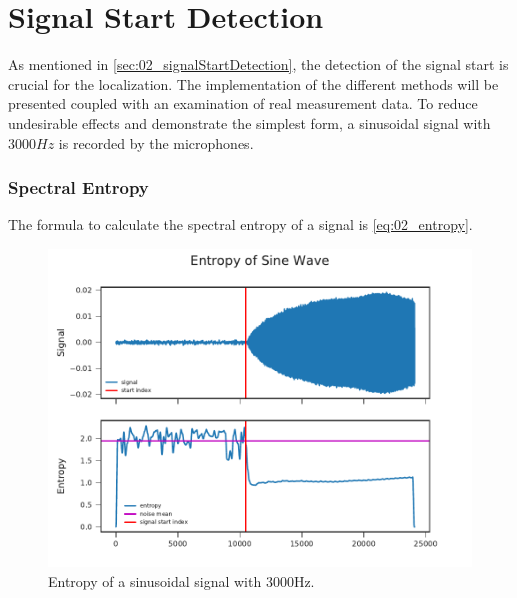 \section{Signal Start Detection}
\label{sec:03_signalStartDetection}

As mentioned in \ref{sec:02_signalStartDetection}, the detection of the
signal start is crucial for the localization.
The implementation of the different methods will be presented coupled with
an examination of real measurement data.
To reduce undesirable effects and demonstrate the simplest form, a sinusoidal
signal with $3000Hz$ is recorded by the microphones.

\subsubsection{Spectral Entropy}

The formula to calculate the spectral entropy of a signal is \ref{eq:02_entropy}.

\begin{figure}[ht]
	\centering
		\includegraphics[width = 1.0 \columnwidth]{figures/example}
	\caption{Entropy of a sinusoidal signal with 3000Hz.}
\end{figure}
\label{fig:03_entropy}